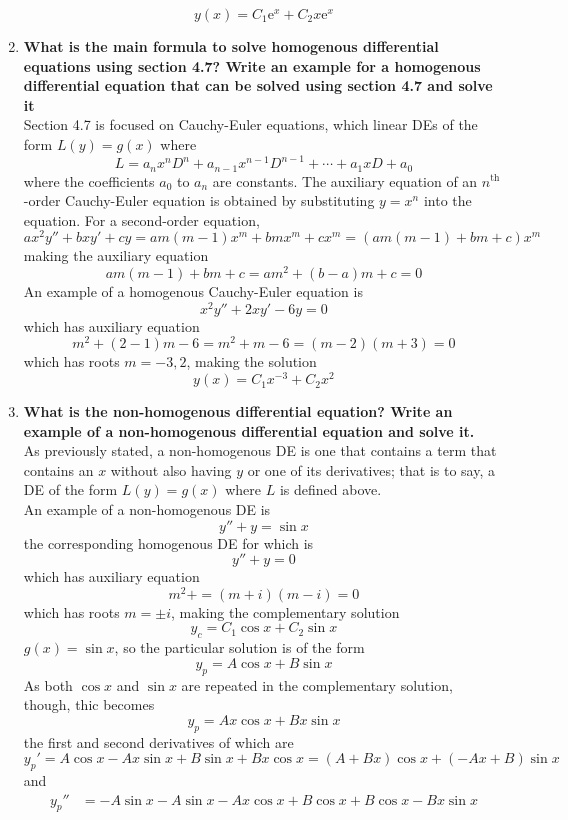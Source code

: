 \documentclass[12pt]{article}
\newcommand{\en}{\text{e}}
\newcommand{\supt}[2]{#1^{\text{#2}}}
\begin{document}
\begin{enumerate}
				\[y(x) = C_1\en^x + C_2x\en^x\]
		\item \textbf{What is the main formula to solve homogenous differential equations using section 4.7? Write an example for a homogenous differential equation that can be solved using section 4.7 and solve it} \\
			Section 4.7 is focused on Cauchy-Euler equations, which linear DEs of the form \(L(y) = g(x)\) where
				\[L = a_nx^nD^n + a_{n - 1}x^{n - 1}D^{n - 1} + \cdots + a_1xD + a_0\]
				where the coefficients \(a_0\) to \(a_n\) are constants. The auxiliary equation of an \(\supt{n}{th}\)-order Cauchy-Euler equation is obtained by substituting \(y = x^n\) into the equation. For a second-order equation,
				\[
					ax^2y'' + bxy' + cy = am(m - 1)x^m + bmx^m + cx^m
						= (am(m - 1) + bm + c)x^m
				\]
				making the auxiliary equation
				\[
					am(m - 1) + bm + c = am^2 + (b - a)m + c
						= 0
				\]
			An example of a homogenous Cauchy-Euler equation is
				\[x^2y'' + 2xy' - 6y = 0\]	
				which has auxiliary equation
				\[
					m^2 + (2 - 1) m - 6 = m^2 + m - 6 
						= (m - 2)(m + 3)
						= 0
				\]
				which has roots \(m = -3, 2\), making the solution
				\[y(x) = C_1x^{-3} + C_2x^2\]
		\item \textbf{What is the non-homogenous differential equation? Write an example of a non-homogenous differential equation and solve it.} \\
			As previously stated, a non-homogenous DE is one that contains a term that contains an \(x\) without also having \(y\) or one of its derivatives; that is to say, a DE of the form \(L(y) = g(x)\) where \(L\) is defined above. \\
			An example of a non-homogenous DE is
				\[y'' + y = \sin x\]
				the corresponding homogenous DE for which is
				\[y'' + y = 0\]
				which has auxiliary equation
				\[m^2 +  = (m + i)(m - i) = 0\]
				which has roots \(m = \pm i\), making the complementary solution
				\[y_c = C_1\cos x + C_2\sin x\]
				\(g(x) = \sin x\), so the particular solution is of the form
				\[y_p = A\cos x + B\sin x\]
				As both \(\cos x\) and \(\sin x\) are repeated in the complementary solution, though, thic becomes
				\[y_p = Ax\cos x + Bx\sin x\]
				the first and second derivatives of which are
				\[
					y_p' = A\cos x - Ax\sin x + B\sin x + Bx\cos x
						= (A + Bx)\cos x + (-Ax + B)\sin x
				\]
				and
				\begin{align*}
					y_p'' &= -A\sin x - A\sin x - Ax\cos x + B\cos x + B\cos x - Bx\sin x \\

\end{align*}
\end{enumerate}
\end{document}
